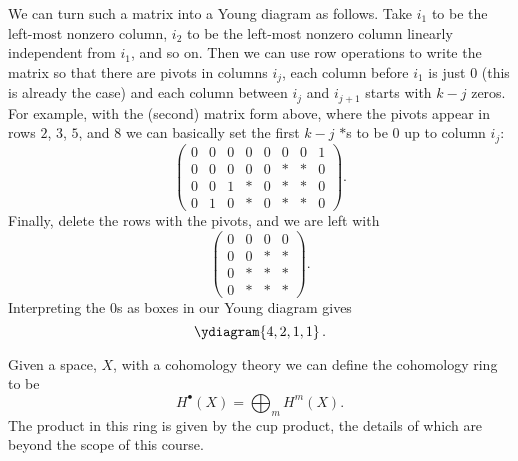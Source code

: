 \documentclass[fleqn]{NotesClass}
\begin{document}
    We can turn such a matrix into a Young diagram as follows.
    Take \(i_1\) to be the left-most nonzero column, \(i_2\) to be the left-most nonzero column linearly independent from \(i_1\), and so on.
    Then we can use row operations to write the matrix so that there are pivots in columns \(i_j\), each column before \(i_1\) is just \(0\) (this is already the case) and each column between \(i_j\) and \(i_{j+1}\) starts with \(k - j\) zeros.
    For example, with the (second) matrix form above, where the pivots appear in rows \(2\), \(3\), \(5\), and \(8\) we can basically set the first \(k - j\) \(*\)s to be \(0\) up to column \(i_j\):
    \begin{equation}
        \begin{pmatrix}
            0 & 0 & 0 & 0 & 0 & 0 & 0 & 1\\
            0 & 0 & 0 & 0 & 0 & * & * & 0\\
            0 & 0 & 1 & * & 0 & * & * & 0\\
            0 & 1 & 0 & * & 0 & * & * & 0
        \end{pmatrix}
        .
    \end{equation}
    Finally, delete the rows with the pivots, and we are left with
    \begin{equation}
        \begin{pmatrix}
            0 & 0 & 0 & 0\\
            0 & 0 & * & *\\
            0 & * & * & *\\
            0 & * & * & *
        \end{pmatrix}
        .
    \end{equation}
    Interpreting the \(0\)s as boxes in our Young diagram gives
    \begin{equation}
        \ydiagram{4,2,1,1}\,.
    \end{equation}
    
    
    Given a space, \(X\), with a cohomology theory we can define the cohomology ring to be
    \begin{equation}
        H^{\bullet}(X) = \bigoplus_m H^m(X).
    \end{equation}
    The product in this ring is given by the cup product, the details of which are beyond the scope of this course.
    
\end{document}

